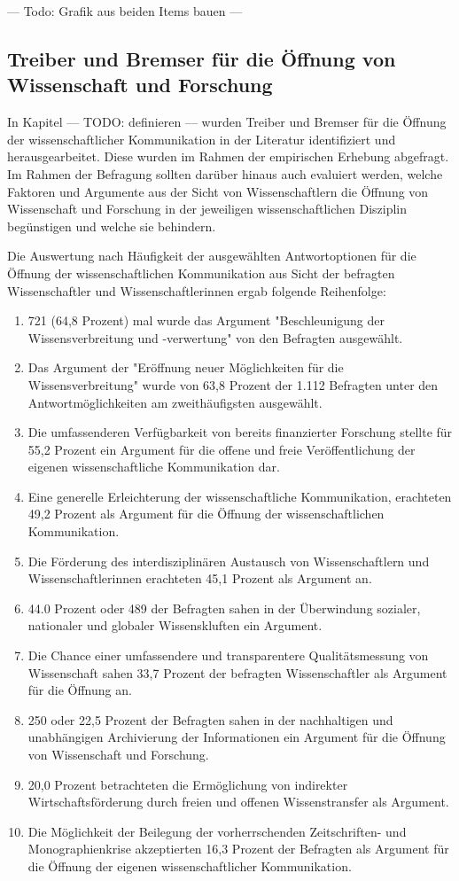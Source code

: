 --- Todo: Grafik aus beiden Items bauen ---

\subsection{Treiber und Bremser für die Öffnung von Wissenschaft und Forschung}

In Kapitel --- TODO: definieren --- wurden Treiber und Bremser für die Öffnung der wissenschaftlicher Kommunikation in der Literatur identifiziert und herausgearbeitet. Diese wurden im Rahmen der empirischen Erhebung abgefragt. Im Rahmen der Befragung sollten darüber hinaus auch evaluiert werden, welche Faktoren und Argumente aus der Sicht von Wissenschaftlern die Öffnung von Wissenschaft und Forschung in der jeweiligen wissenschaftlichen Disziplin begünstigen und welche sie behindern.

Die Auswertung nach Häufigkeit der ausgewählten Antwortoptionen für die Öffnung der wissenschaftlichen Kommunikation aus Sicht der befragten Wissenschaftler und Wissenschaftlerinnen ergab folgende Reihenfolge:
\begin{enumerate}
\item 721 (64,8 Prozent) mal wurde das Argument "Beschleunigung der Wissensverbreitung und -verwertung" von den Befragten ausgewählt.
\item Das Argument der "Eröffnung neuer Möglichkeiten für die Wissensverbreitung" wurde von 63,8 Prozent der 1.112 Befragten unter den Antwortmöglichkeiten am zweithäufigsten ausgewählt.
\item Die umfassenderen Verfügbarkeit von bereits finanzierter Forschung stellte für 55,2 Prozent ein Argument für die offene und freie Veröffentlichung der eigenen wissenschaftliche Kommunikation dar.
\item Eine generelle Erleichterung der wissenschaftliche Kommunikation, erachteten 49,2 Prozent als Argument für die Öffnung der wissenschaftlichen Kommunikation.
\item Die Förderung des interdisziplinären Austausch von Wissenschaftlern und Wissenschaftlerinnen erachteten 45,1 Prozent als Argument an.
\item 44.0 Prozent oder 489 der Befragten sahen in der Überwindung sozialer, nationaler und globaler Wissenskluften ein Argument.
\item Die Chance einer umfassendere und transparentere Qualitätsmessung von Wissenschaft sahen 33,7 Prozent der befragten Wissenschaftler als Argument für die Öffnung an.
\item 250 oder 22,5 Prozent der Befragten sahen in der nachhaltigen und unabhängigen Archivierung der Informationen ein Argument für die Öffnung von Wissenschaft und Forschung.
\item 20,0 Prozent betrachteten die Ermöglichung von indirekter Wirtschaftsförderung durch freien und offenen Wissenstransfer als Argument.
\item Die Möglichkeit der Beilegung der vorherrschenden Zeitschriften- und Monographienkrise akzeptierten 16,3 Prozent der Befragten als Argument für die Öffnung der eigenen wissenschaftlicher Kommunikation.
\end{enumerate}

